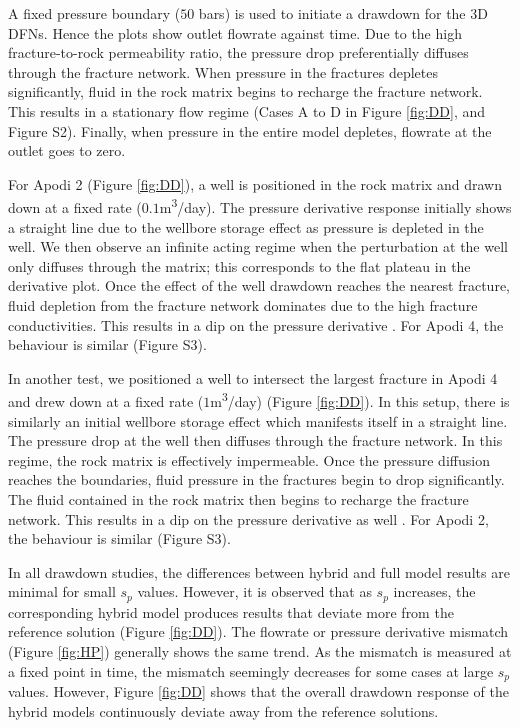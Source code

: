 \documentclass[draft]{agujournal2018}
\begin{document}
A fixed pressure boundary ($50$ bars) is used to initiate a drawdown for the 3D DFNs. Hence the plots show outlet flowrate against time. Due to the high fracture-to-rock permeability ratio, the pressure drop preferentially diffuses through the fracture network. When pressure in the fractures depletes significantly, fluid in the rock matrix begins to recharge the fracture network. This results in a stationary flow regime (Cases A to D in Figure \ref{fig:DD}, and Figure S2). Finally, when pressure in the entire model depletes, flowrate at the outlet goes to zero.

For Apodi 2 (Figure \ref{fig:DD}), a well is positioned in the rock matrix and drawn down at a fixed rate ($0.1$m\textsuperscript{3}/day). The pressure derivative response initially shows a straight line due to the wellbore storage effect as pressure is depleted in the well. We then observe an infinite acting regime when the perturbation at the well only diffuses through the matrix; this corresponds to the flat plateau in the derivative plot. Once the effect of the well drawdown reaches the nearest fracture, fluid depletion from the fracture network dominates due to the high fracture conductivities. This results in a dip on the pressure derivative \citep{Bourdet1989, Egya2018}. For Apodi 4, the behaviour is similar (Figure S3).

In another test, we positioned a well to intersect the largest fracture in Apodi 4 and drew down at a fixed rate ($1$m\textsuperscript{3}/day) (Figure \ref{fig:DD}). In this setup, there is similarly an initial wellbore storage effect which manifests itself in a straight line. The pressure drop at the well then diffuses through the fracture network. In this regime, the rock matrix is effectively impermeable. Once the pressure diffusion reaches the boundaries, fluid pressure in the fractures begin to drop significantly. The fluid contained in the rock matrix then begins to recharge the fracture network. This results in a dip on the pressure derivative as well \citep{Gringarten1987}. For Apodi 2, the behaviour is similar (Figure S3).

In all drawdown studies, the differences between hybrid and full model results are minimal for small $s_p$ values. However, it is observed that as $s_p$ increases, the corresponding hybrid model produces results that deviate more from the reference solution (Figure \ref{fig:DD}). The flowrate or pressure derivative mismatch (Figure \ref{fig:HP}) generally shows the same trend. As the mismatch is measured at a fixed point in time, the mismatch seemingly decreases for some cases at large $s_p$ values. However, Figure \ref{fig:DD} shows that the overall drawdown response of the hybrid models continuously deviate away from the reference solutions. 
\end{document}
